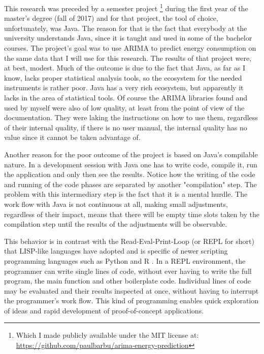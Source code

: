 \documentclass[12pt,a4paper,titlepage]{report}
\begin{document}
This research was preceded by a semester project \footnote{Which I made publicly available under the MIT license at: \url{https://github.com/paulbarbu/arima-energy-prediction}} during the first year of the master's degree (fall of 2017) and for that project, the tool of choice, unfortunately, was Java. The reason for that is the fact that everybody at the university understands Java, since it is taught and used in some of the bachelor courses. The project's goal was to use ARIMA to predict energy consumption on the same data that I will use for this research. The results of that project were, at best, modest. Much of the outcome is due to the fact that Java, as far as I know, lacks proper statistical analysis tools, so the ecosystem for the needed instruments is rather poor. Java has a very rich ecosystem, but apparently it lacks in the area of statistical tools. Of course the ARIMA libraries found and used by myself were also of low quality, at least from the point of view of the documentation. They were laking the instructions on how to use them, regardless of their internal quality, if there is no user manual, the internal quality has no value since it cannot be taken advantage of.

Another reason for the poor outcome of the project is based on Java's compilable nature. In a development session with Java one has to write code, compile it, run the application and only then see the results. Notice how the writing of the code and running of the code phases are separated by another "compilation" step. The problem with this intermediary step is the fact that it is a mental hurdle. The work flow with Java is not continuous at all, making small adjustments, regardless of their impact, means that there will be empty time slots taken by the compilation step until the results of the adjustments will be observable.

This behavior is in contrast with the Read-Eval-Print-Loop (or REPL for short) that LISP-like languages have adopted and is specific of newer scripting programming languages such as Python and R \cite{hey2014computing}. In a REPL environment, the programmer can write single lines of code, without ever having to write the full program, the main function and other boilerplate code. Individual lines of code may be evaluated and their results inspected at once, without having to interrupt the programmer's work flow. This kind of programming enables quick exploration of ideas and rapid development of proof-of-concept applications.
\end{document}
